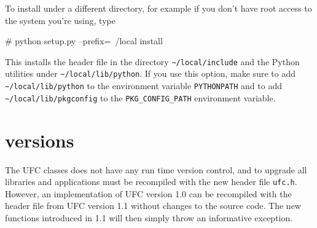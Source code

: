 To install \ufc{} under a different directory, for example if you
don't have root access to the system you're using, type
\begin{code}
# python setup.py --prefix=~/local install 
\end{code}
This installs the \ufc{} header file in the directory
\texttt{\~{}/local/include} and the Python utilities under
\texttt{\~{}/local/lib/python}. If you use this option, make sure to
add \texttt{\~{}/local/lib/python} to the environment variable
\texttt{PYTHONPATH} and to add \texttt{\~{}/local/lib/pkgconfig} to
the \texttt{PKG\_CONFIG\_PATH} environment variable.

\section{\ufc{} versions}
The UFC classes does not have any run time version control, and to upgrade
all libraries and applications must be recompiled with the new header file \texttt{ufc.h}.
However, an implementation of UFC version 1.0 can be recompiled with the header file
from UFC version 1.1 without changes to the source code. The new functions introduced in 1.1
will then simply throw an informative exception.

